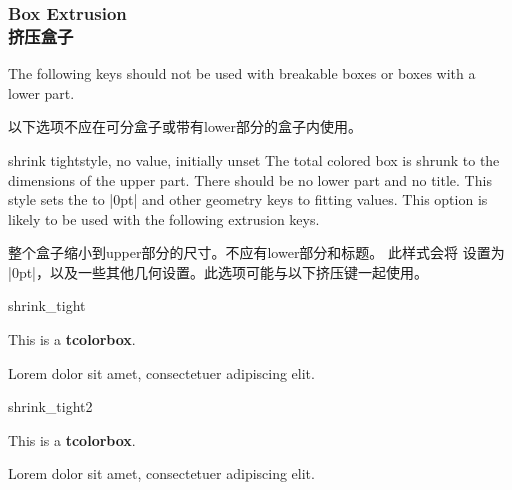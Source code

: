 
\subsubsection{Box Extrusion\\挤压盒子}

\begin{marker}
The following keys should not be used with breakable boxes or boxes with a
lower part.

以下选项不应在可分盒子或带有lower部分的盒子内使用。
\end{marker}

\begin{docTcbKey}{shrink tight}{}{style, no value, initially unset}
The total colored box is shrunk to the dimensions of the upper
part. There should be no lower part and no title.
This style sets the  to |0pt| and other geometry keys
to fitting values. This option is likely to be used with the following
extrusion keys.

整个盒子缩小到upper部分的尺寸。不应有lower部分和标题。
此样式会将  设置为 |0pt|，以及一些其他几何设置。此选项可能与以下挤压键一起使用。
\begin{exdispExample}{shrink_tight}

\begin{tcolorbox}
This is a \textbf{tcolorbox}.
\end{tcolorbox}

Lorem  dolor sit amet, consectetuer adipiscing elit.
\end{exdispExample}

\begin{exdispExample}{shrink_tight2}

\begin{tcolorbox}
This is a \textbf{tcolorbox}.
\end{tcolorbox}

Lorem  dolor sit amet, consectetuer adipiscing elit.
\end{exdispExample}
\end{docTcbKey}  

